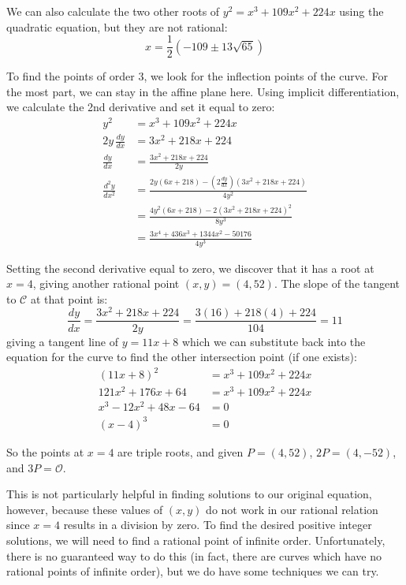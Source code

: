 \documentclass{article}
\begin{document}
We can also calculate the two other roots of $y^2=x^3+109x^2+224x$ using the quadratic equation, but
they are not rational:
\[ x = \frac{1}{2}(-109 \pm 13\sqrt{65}) \]

To find the points of order 3, we look for the inflection points of the curve. For the most part, we can stay
in the affine plane here. Using implicit differentiation, we calculate the 2nd derivative and set it equal to zero:
\begin{equation*}
	\begin{split}
		y^2 &= x^3 + 109x^2 + 224x \\
		2y\, \frac{dy}{dx} &= 3x^2 + 218x + 224 \\
		\frac{dy}{dx} &= \frac{3x^2+218x+224}{2y} \\
		\frac{d^2y}{dx^2} &= \frac{2y(6x+218) - (2\frac{dy}{dx})(3x^2+218x+224)}{4y^2} \\
		&= \frac{4y^2(6x+218) - 2(3x^2+218x+224)^2}{8y^3} \\
		&= \frac{3x^4+436x^3+1344x^2-50176}{4y^3} 
	\end{split}
\end{equation*}

Setting the second derivative equal to zero, we discover that it has a root at $x=4$, giving another rational
point $(x,y) = (4,52)$. The slope of the tangent to $\mathcal{C}$ at that point is:
\[ \frac{dy}{dx} = \frac{3x^2+218x+224}{2y} = \frac{3(16) + 218(4) + 224}{104} = 11 \]
giving a tangent line of $y = 11x + 8$ which we can substitute back into the equation for the curve to
find the other intersection point (if one exists):
\begin{equation*}
	\begin{split} 
		(11x+8)^2 &= x^3+109x^2+224x \\
		121x^2+176x+64 &= x^3+109x^2+224x \\
		x^3-12x^2+48x-64 &= 0 \\
		(x-4)^3 &= 0
	\end{split}
\end{equation*}

So the points at $x=4$ are triple roots, and given $P=(4,52)$, $2P = (4,-52)$, and $3P = \mathcal{O}$.

This is not particularly helpful in finding solutions to our original equation, however, because these
values of $(x,y)$ do not work in our rational relation since $x=4$ results in a division by zero. To
find the desired positive integer solutions, we will need to find a rational point of infinite order.
Unfortunately, there is no guaranteed way to do this (in fact, there are curves which have no rational
points of infinite order), but we do have some techniques we can try.
\end{document}
